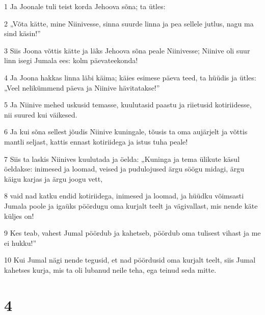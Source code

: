 \par 1 Ja Joonale tuli teist korda Jehoova sõna; ta ütles:
\par 2 „Võta kätte, mine Niinivesse, sinna suurde linna ja pea sellele jutlus, nagu ma sind käsin!”
\par 3 Siis Joona võttis kätte ja läks Jehoova sõna peale Niinivesse; Niinive oli suur linn isegi Jumala ees: kolm päevateekonda!
\par 4 Ja Joona hakkas linna läbi käima; käies esimese päeva teed, ta hüüdis ja ütles: „Veel nelikümmend päeva ja Niinive hävitatakse!”
\par 5 Ja Niinive mehed uskusid temasse, kuulutasid paastu ja riietusid kotiriidesse, nii suured kui väikesed.
\par 6 Ja kui sõna sellest jõudis Niinive kuningale, tõusis ta oma aujärjelt ja võttis mantli seljast, kattis ennast kotiriidega ja istus tuha peale!
\par 7 Siis ta laskis Niinives kuulutada ja öelda: „Kuninga ja tema ülikute käsul öeldakse: inimesed ja loomad, veised ja pudulojused ärgu söögu midagi, ärgu käigu karjas ja ärgu joogu vett,
\par 8 vaid nad katku endid kotiriidega, inimesed ja loomad, ja hüüdku võimsasti Jumala poole ja igaüks pöördugu oma kurjalt teelt ja vägivallast, mis nende käte küljes on!
\par 9 Kes teab, vahest Jumal pöördub ja kahetseb, pöördub oma tulisest vihast ja me ei hukku!”
\par 10 Kui Jumal nägi nende tegusid, et nad pöördusid oma kurjalt teelt, siis Jumal kahetses kurja, mis ta oli lubanud neile teha, ega teinud seda mitte.


\chapter{4}

